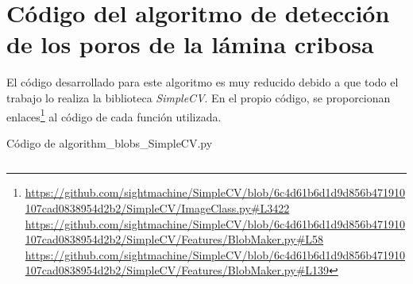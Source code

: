 \chapter{Código del algoritmo de detección de los poros de la lámina
  cribosa}

El código desarrollado para este algoritmo es muy reducido debido a
que todo el trabajo lo realiza la biblioteca \emph{SimpleCV}. En el
propio código, se proporcionan
enlaces\footnote{\url{https://github.com/sightmachine/SimpleCV/blob/6c4d61b6d1d9d856b471910107cad0838954d2b2/SimpleCV/ImageClass.py\#L3422}
  \\\url{https://github.com/sightmachine/SimpleCV/blob/6c4d61b6d1d9d856b471910107cad0838954d2b2/SimpleCV/Features/BlobMaker.py\#L58}
  \\
  \url{https://github.com/sightmachine/SimpleCV/blob/6c4d61b6d1d9d856b471910107cad0838954d2b2/SimpleCV/Features/BlobMaker.py\#L139}}
al código de cada función utilizada.
\begin{codigo_python}
\caption{Código de algorithm\_blobs\_SimpleCV.py}
  \inputminted[fontsize=\scriptsize, linenos, breaklines]{python}{../OpenCV/algorithm_blobs_SimpleCV.py}
\end{codigo_python}